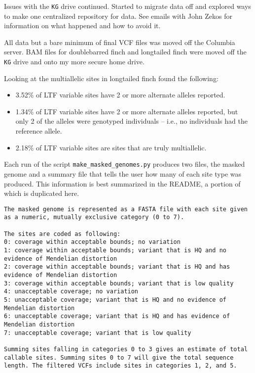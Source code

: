 \documentclass[idxtotoc,hyperref,openany,oneside]{labbook} %
\begin{document}
Issues with the \verb /KG/  drive continued. Started to migrate data off and explored ways to make one centralized repository for data. See emails with John Zekos for information on what happened and how to avoid it.


All data but a bare minimum of final VCF files was moved off the Columbia server. BAM files for doublebarred finch and longtailed finch were moved off the \verb /KG/ drive and onto my more secure home drive.

Looking at the multiallelic sites in longtailed finch found the following:
\begin{itemize}
\item 3.52\% of LTF variable sites have 2 or more alternate alleles reported.
\item 1.34\% of LTF variable sites have 2 or more alternate alleles reported, but only 2 of the alleles were genotyped individuals -- i.e., no individuals had the reference allele.
\item 2.18\% of LTF variable sites are sites that are truly multiallelic.
\end{itemize}

Each run of the script \texttt{make\_masked\_genomes.py} produces two files, the masked genome and a summary file that tells the user how many of each site type was produced. This information is best summarized in the README, a portion of which is duplicated here. \\

\begin{verbatim}
The masked genome is represented as a FASTA file with each site given as a numeric, mutually exclusive category (0 to 7). 

The sites are coded as following:  
0: coverage within acceptable bounds; no variation  
1: coverage within acceptable bounds; variant that is HQ and no evidence of Mendelian distortion 
2: coverage within acceptable bounds; variant that is HQ and has evidence of Mendelian distortion 
3: coverage within acceptable bounds; variant that is low quality  
4: unacceptable coverage; no variation  
5: unacceptable coverage; variant that is HQ and no evidence of Mendelian distortion  
6: unacceptable coverage; variant that is HQ and has evidence of Mendelian distortion 
7: unacceptable coverage; variant that is low quality  

Summing sites falling in categories 0 to 3 gives an estimate of total callable sites. Summing sites 0 to 7 will give the total sequence length. The filtered VCFs include sites in categories 1, 2, and 5.
\end{verbatim}
\end{document}

